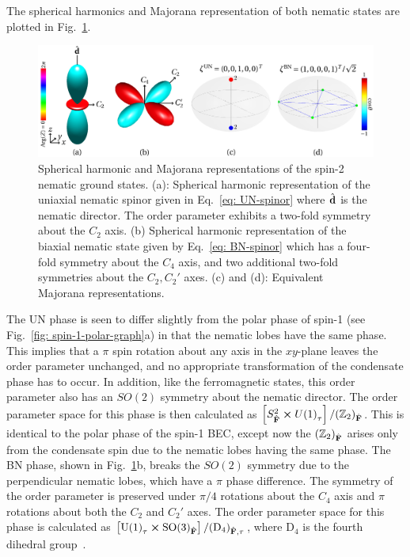 The spherical harmonics and Majorana representation of both nematic states are
plotted in Fig.~\ref{fig: nematic-graph}.
\begin{figure}
    \centering
    \includegraphics[width=\textwidth]
    {gfx/ch-groundStateSymmetries/spin-2-nematic.pdf}
    \caption[Graphical representations of the spin-2 nematic ground states]
    {\label{fig: nematic-graph}Spherical harmonic and Majorana representations
    of the spin-2 nematic ground states.
    (a): Spherical harmonic representation of the uniaxial nematic spinor given
    in Eq.~\eqref{eq: UN-spinor} where \(\hat{\vb{d}}\) is the nematic director.
    The order parameter exhibits a two-fold symmetry about the \(C_2\) axis.
    (b) Spherical harmonic representation of the biaxial nematic state given by
    Eq.~\eqref{eq: BN-spinor} which has a four-fold symmetry about the \(C_4\)
    axis, and two additional two-fold symmetries about the \(C_2, C_2'\) axes.
    (c) and (d): Equivalent Majorana representations.}
\end{figure}
The UN phase is seen to differ slightly from the polar phase of spin-1 (see
Fig.~\ref{fig: spin-1-polar-graph}a) in that the nematic lobes have the
same phase.
This implies that a \(\pi \) spin rotation about any axis in the \(xy\)-plane
leaves the order parameter unchanged, and no appropriate transformation of the
condensate phase has to occur.
In addition, like the ferromagnetic states, this order parameter also has an
\(SO(2)\) symmetry about the nematic director.
The order parameter space for this phase is then calculated as
\(\left[S^2_{\hat{\vb{F}}} \cross {U(1)}_\tau\right]
/ {({\mathbb{Z}}_2)}_{\hat{\vb{F}}} \).
This is identical to the polar phase of the spin-1 BEC, except now the
\({(\mathbb{Z}_2)}_{\hat{\vb{F}}}\) arises only from the condensate spin due to
the nematic lobes having the same phase.
The BN phase, shown in Fig.~\ref{fig: nematic-graph}b, breaks the
\(SO(2)\) symmetry due to the perpendicular nematic lobes, which have a \(\pi \)
phase difference.
The symmetry of the order parameter is preserved under \(\pi/4\) rotations
about the \(C_4\) axis and \(\pi\) rotations about both the \(C_2\) and \(C_2'\)
axes.
The order parameter space for this phase is calculated as
\(\left[{\text{U}(1)}_\tau \cross {\text{SO}(3)}_{\hat{\vb{F}}}\right]
/ {(\text{D}_4)}_{\hat{\vb{F}}, \tau}\), where \(\text{D}_4\) is the fourth
dihedral group~\cite{Kobayashi2012}.

